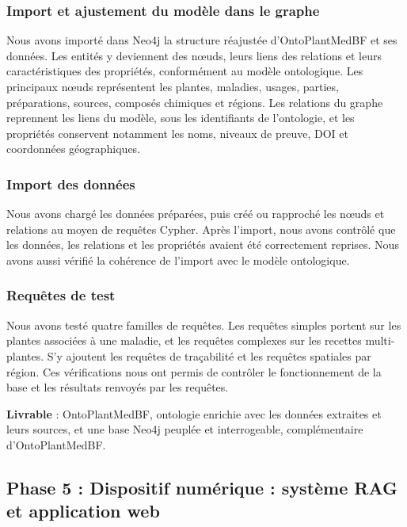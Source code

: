 \subsubsection{Import et ajustement du modèle dans le graphe}

Nous avons importé dans Neo4j la structure réajustée d'OntoPlantMedBF et ses données. Les entités y deviennent des nœuds, leurs liens des relations et leurs caractéristiques des propriétés, conformément au modèle ontologique. Les principaux nœuds représentent les plantes, maladies, usages, parties, préparations, sources, composés chimiques et régions. Les relations du graphe reprennent les liens du modèle, sous les identifiants de l'ontologie, et les propriétés conservent notamment les noms, niveaux de preuve, DOI et coordonnées géographiques.

\subsubsection{Import des données}

Nous avons chargé les données préparées, puis créé ou rapproché les nœuds et relations au moyen de requêtes Cypher. Après l'import, nous avons contrôlé que les données, les relations et les propriétés avaient été correctement reprises. Nous avons aussi vérifié la cohérence de l'import avec le modèle ontologique.

\subsubsection{Requêtes de test}

Nous avons testé quatre familles de requêtes. Les requêtes simples portent sur les plantes associées à une maladie, et les requêtes complexes sur les recettes multi-plantes. S'y ajoutent les requêtes de traçabilité et les requêtes spatiales par région. Ces vérifications nous ont permis de contrôler le fonctionnement de la base et les résultats renvoyés par les requêtes.

\textbf{Livrable} : OntoPlantMedBF, ontologie enrichie avec les données extraites et leurs sources, et une base Neo4j peuplée et interrogeable, complémentaire d'OntoPlantMedBF.


\subsection{Phase 5 : Dispositif numérique : système RAG et application web}
\label{subsec:phase5}

